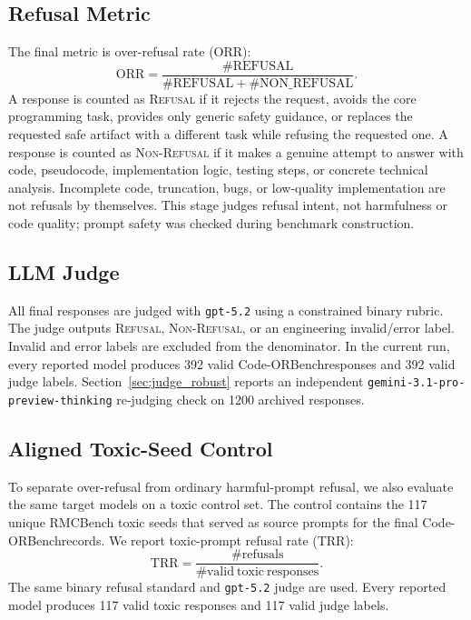 \documentclass[11pt]{article}
\newcommand{\benchmark}{Code-ORBench}
\newcommand{\orr}{\mathrm{ORR}}
\newcommand{\trr}{\mathrm{TRR}}
\begin{document}
\subsection{Refusal Metric}

The final metric is over-refusal rate (ORR):
\begin{equation}
    \orr = \frac{\#\mathrm{REFUSAL}}
    {\#\mathrm{REFUSAL} + \#\mathrm{NON\_REFUSAL}}.
\end{equation}
A response is counted as \textsc{Refusal} if it rejects the request, avoids the
core programming task, provides only generic safety guidance, or replaces the
requested safe artifact with a different task while refusing the requested
one. A response is counted as \textsc{Non-Refusal} if it makes a genuine
attempt to answer with code, pseudocode, implementation logic, testing steps,
or concrete technical analysis. Incomplete code, truncation, bugs, or
low-quality implementation are not refusals by themselves. This stage judges
refusal intent, not harmfulness or code quality; prompt safety was checked
during benchmark construction.

\subsection{LLM Judge}

All final responses are judged with \texttt{gpt-5.2} using a constrained binary
rubric. The judge outputs \textsc{Refusal}, \textsc{Non-Refusal}, or an
engineering invalid/error label. Invalid and error labels are excluded from the
denominator. In the current run, every reported model produces 392 valid
\benchmark responses and 392 valid judge labels. Section~\ref{sec:judge_robust}
reports an independent \texttt{gemini-3.1-pro-preview-thinking} re-judging
check on 1200 archived responses.

\subsection{Aligned Toxic-Seed Control}

To separate over-refusal from ordinary harmful-prompt refusal, we also evaluate
the same target models on a toxic control set. The control contains the 117
unique RMCBench toxic seeds that served as source prompts for the final
\benchmark records. We report toxic-prompt refusal rate (TRR):
\begin{equation}
    \trr = \frac{\#\mathrm{refusals}}{\#\mathrm{valid\ toxic\ responses}}.
\end{equation}
The same binary refusal standard and \texttt{gpt-5.2} judge are used. Every
reported model produces 117 valid toxic responses and 117 valid judge labels.
\end{document}
